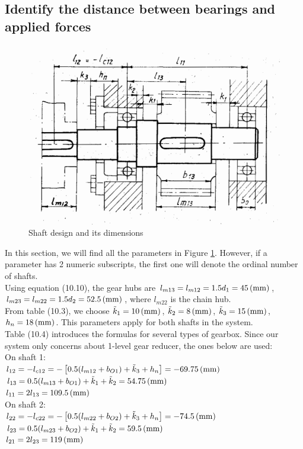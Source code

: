 \subsection{Identify the distance between bearings and applied forces}

\begin{figure}[ht]
	\centering	\includegraphics[width=150mm]{shaft1.png}
	\caption{Shaft design and its dimensions}
	\label{shaft}
\end{figure}

In this section, we will find all the parameters in Figure \ref{shaft}. However, if a parameter has 2 numeric subscripts, the first one will denote the ordinal number of shafts.\\
Using equation (10.10), the gear hubs are $ l_{m13} = l_{m12} = 1.5d_1 =  45\, (\mathrm{mm}) $, $ l_{m23} = l_{m22} = 1.5d_2 = 52.5\, (\mathrm{mm}) $, where $ l_{m22} $ is the chain hub.\\
From table (10.3), we choose $ \tilde{k}_1=10\, (\mathrm{mm})$, $ \tilde{k}_2=8\, (\mathrm{mm}) $, $ \tilde{k}_3=15\, (\mathrm{mm}) $, $ h_n=18\, (\mathrm{mm}) $. This parameters apply for both shafts in the system.\\
Table (10.4) introduces the formulas for several types of gearbox. Since our system only concerns about 1-level gear reducer, the ones below are used:\\
On shaft 1:\\
$ l_{12} = -l_{c12} = -\left[ 0.5(l_{m12}+b_{O1})+\tilde{k}_3+h_n  \right] = -69.75 \, (\mathrm{mm}) $\\
$ l_{13} = 0.5(l_{m13}+b_{O1})+\tilde{k}_1+\tilde{k}_2 = 54.75 \, (\mathrm{mm}) $\\
$ l_{11} = 2l_{13} = 109.5 \, (\mathrm{mm})$\\
On shaft 2:\\
$ l_{22} = -l_{c22} = -\left[ 0.5(l_{m22}+b_{O2})+\tilde{k}_3+h_n \right] = -74.5 \, (\mathrm{mm}) $\\
$ l_{23} = 0.5(l_{m23}+b_{O2})+\tilde{k}_1+\tilde{k}_2 = 59.5 \, (\mathrm{mm}) $\\
$ l_{21} = 2l_{23} = 119 \, (\mathrm{mm})$


